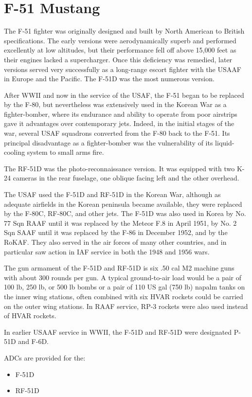 \section*{F-51 Mustang}

The F-51 fighter was originally designed and built by North American to British specifications. The early versions were aerodynamically superb and performed excellently at low altitudes, but their performance fell off above 15,000 feet as their engines lacked a supercharger. Once this deficiency was remedied, later versions served very successfully as a long-range escort fighter with the USAAF in Europe and the Pacific. The F-51D was the most numerous version.

After WWII and now in the service of the USAF, the F-51 began to be replaced by the F-80, but nevertheless was extensively used in the Korean War as a fighter-bomber, where its endurance and ability to operate from poor airstrips gave it advantages over contemporary jets. Indeed, in the initial stages of the war, several USAF squadrons converted from the F-80 back to the F-51. Its principal disadvantage as a fighter-bomber was the vulnerability of its liquid-cooling system to small arms fire.

The RF-51D was the photo-reconnaissance version. It was equipped with two K-24 cameras in the rear fuselage, one oblique facing left and the other overhead. 

The USAF used the F-51D and RF-51D in the Korean War, although as adequate airfields in the Korean peninsula became available, they were replaced by the F-80C, RF-80C, and other jets. The F-51D was also used in Korea by No. 77 Sqn RAAF until it was replaced by the Meteor F.8 in April 1951, by No. 2 Sqn SAAF until it was replaced by the F-86 in December 1952, and by the RoKAF. They also served in the air forces of many other countries, and in particular saw action in IAF service in both the 1948 and 1956 wars. 

The gun armament of the F-51D and RF-51D is six .50 cal M2 machine guns with about 300 rounds per gun. A typical ground-to-air load would be a pair of 100 lb, 250 lb, or 500 lb bombs or a pair of 110 US gal (750 lb) napalm tanks on the inner wing stations, often combined with six HVAR rockets could be carried on the outer wing stations. In RAAF service, RP-3 rockets were also used instead of HVAR rockets.

In earlier USAAF service in WWII, the F-51D and RF-51D were designated P-51D and F-6D.

ADCs are provided for the:
\begin{itemize}
\item F-51D
\item RF-51D
\end{itemize}
